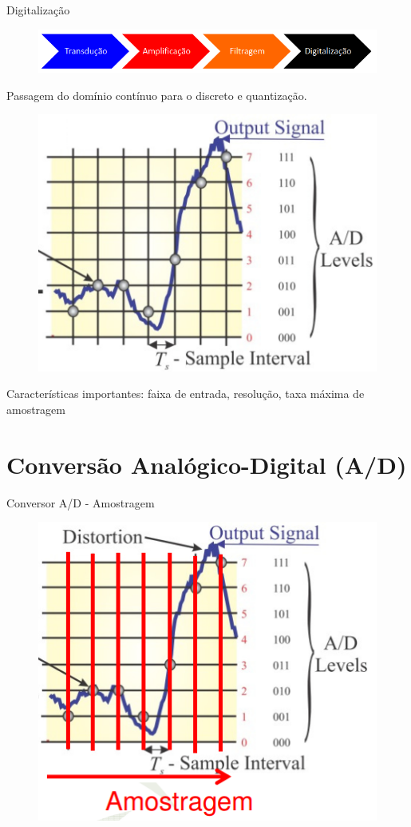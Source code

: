 \documentclass[aspectratio=169,
				xcolor=table]{beamer}
\begin{document}
	\begin{frame}{Digitalização}
		\begin{figure}[hbtp]
			\centering
			\includegraphics[width=\textwidth, keepaspectratio]{../figs/cap01/sistema01.png}
		\end{figure}	
		
		Passagem do domínio contínuo para o discreto e quantização.
				
		\begin{figure}[hbtp]
			\centering
			\includegraphics[width=.25\textwidth, keepaspectratio]{../figs/cap01/ad01.png}
		\end{figure}	
		
		Características importantes: faixa de entrada, resolução, taxa máxima de amostragem
	\end{frame}	
	
	
	\section{Conversão Analógico-Digital (A/D)}
	
	\begin{frame}{Conversor A/D - Amostragem}	
		\begin{figure}[hbtp]
			\centering
			\includegraphics[width=.35\textwidth, keepaspectratio]{../figs/cap01/ad02.png}
		\end{figure}
	\end{frame}
	
\end{document}
